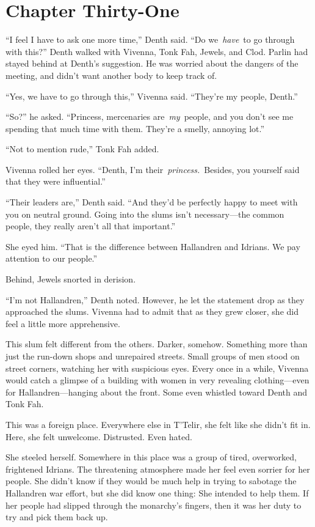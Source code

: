 \section{Chapter Thirty-One}

“I feel I have to ask one more time,” Denth said. “Do we~\textit{have}~to go through with this?” Denth walked with Vivenna, Tonk Fah, Jewels, and Clod. Parlin had stayed behind at Denth’s suggestion. He was worried about the dangers of the meeting, and didn’t want another body to keep track of.

“Yes, we have to go through this,” Vivenna said. “They’re my people, Denth.”

“So?” he asked. “Princess, mercenaries are~\textit{my}~people, and you don’t see me spending that much time with them. They’re a smelly, annoying lot.”

“Not to mention rude,” Tonk Fah added.

Vivenna rolled her eyes. “Denth, I’m their~\textit{princess.}~Besides, you yourself said that they were influential.”

“Their leaders are,” Denth said. “And they’d be perfectly happy to meet with you on neutral ground. Going into the slums isn’t necessary—the common people, they really aren’t all that important.”

She eyed him. “That is the difference between Hallandren and Idrians. We pay attention to our people.”

Behind, Jewels snorted in derision.

“I’m not Hallandren,” Denth noted. However, he let the statement drop as they approached the slums. Vivenna had to admit that as they grew closer, she did feel a little more apprehensive.

This slum felt different from the others. Darker, somehow. Something more than just the run-down shops and unrepaired streets. Small groups of men stood on street corners, watching her with suspicious eyes. Every once in a while, Vivenna would catch a glimpse of a building with women in very revealing clothing—even for Hallandren—hanging about the front. Some even whistled toward Denth and Tonk Fah.

This was a foreign place. Everywhere else in T’Telir, she felt like she didn’t fit in. Here, she felt unwelcome. Distrusted. Even hated.

She steeled herself. Somewhere in this place was a group of tired, overworked, frightened Idrians. The threatening atmosphere made her feel even sorrier for her people. She didn’t know if they would be much help in trying to sabotage the Hallandren war effort, but she did know one thing: She intended to help them. If her people had slipped through the monarchy’s fingers, then it was her duty to try and pick them back up.

